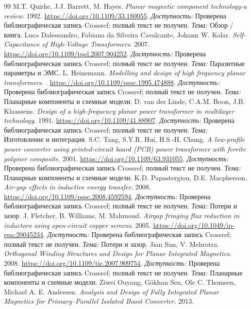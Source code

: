 \documentclass[14pt,a4paper]{extarticle}
\begin{document}
\begin{thebibliography}{99}
M.T. Quirke, J.J. Barrett, M. Hayes. \textit{Planar magnetic component technology-a review}. 1992.
\url{https://doi.org/10.1109/33.180055}.
\textit{Доступность:} Проверена библиографическая запись Crossref; полный текст не получен. \textit{Тема:} Обзор / книга.
Luca Dalessandro, Fabiana da Silveira Cavalcante, Johann W. Kolar. \textit{Self-Capacitance of High-Voltage Transformers}. 2007.
\url{https://doi.org/10.1109/tpel.2007.904252}.
\textit{Доступность:} Проверена библиографическая запись Crossref; полный текст не получен. \textit{Тема:} Паразитные параметры и ЭМС.
L. Heinemann. \textit{Modelling and design of high frequency planar transformers}. .
\url{https://doi.org/10.1109/pesc.1995.474888}.
\textit{Доступность:} Проверена библиографическая запись Crossref; полный текст не получен. \textit{Тема:} Планарные компоненты и схемные модели.
D. van der Linde, C.A.M. Boon, J.B. Klaassens. \textit{Design of a high-frequency planar power transformer in multilayer technology}. 1991.
\url{https://doi.org/10.1109/41.88907}.
\textit{Доступность:} Проверена библиографическая запись Crossref; полный текст не получен. \textit{Тема:} Изготовление и интеграция.
S.C. Tang, S.Y.R. Hui, H.S.-H. Chung. \textit{A low-profile power converter using printed-circuit board (PCB) power transformer with ferrite polymer composite}. 2001.
\url{https://doi.org/10.1109/63.931055}.
\textit{Доступность:} Проверена библиографическая запись Crossref; полный текст не получен. \textit{Тема:} Планарные компоненты и схемные модели.
K.D. Papastergiou, D.E. Macpherson. \textit{Air-gap effects in inductive energy transfer}. 2008.
\url{https://doi.org/10.1109/pesc.2008.4592594}.
\textit{Доступность:} Проверена библиографическая запись Crossref; полный текст не получен. \textit{Тема:} Потери и зазор.
J. Fletcher, B. Williams, M. Mahmoud. \textit{Airgap fringing flux reduction in inductors using open-circuit copper screens}. 2005.
\url{https://doi.org/10.1049/ip-epa:20045234}.
\textit{Доступность:} Проверена библиографическая запись Crossref; полный текст не получен. \textit{Тема:} Потери и зазор.
Jian Sun, V. Mehrotra. \textit{Orthogonal Winding Structures and Design for Planar Integrated Magnetics}. 2008.
\url{https://doi.org/10.1109/tie.2007.909754}.
\textit{Доступность:} Проверена библиографическая запись Crossref; полный текст не получен. \textit{Тема:} Планарные компоненты и схемные модели.
Ziwei Ouyang, Gökhan Sen, Ole C. Thomsen, Michael A. E. Andersen. \textit{Analysis and Design of Fully Integrated Planar Magnetics for Primary–Parallel Isolated Boost Converter}. 2013.

\end{thebibliography}
\end{document}
